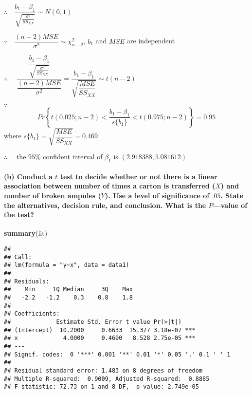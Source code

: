 \documentclass[]{article}
\newenvironment{Shaded}{\begin{snugshade}}{\end{snugshade}}
\newcommand{\KeywordTok}[1]{\textcolor[rgb]{0.13,0.29,0.53}{\textbf{#1}}}
\newcommand{\NormalTok}[1]{#1}
\let\oldparagraph\paragraph
\renewcommand{\paragraph}[1]{\oldparagraph{#1}\mbox{}}
\begin{document}
\(\therefore\quad \dfrac{b_1-\beta_1}{\sqrt{\frac{\sigma^2}{SS_{XX}}}}\sim N(0,1)\)

\(\because\quad\dfrac{(n-2)MSE}{\sigma^2}\sim \chi^2_{n-2}\), \(b_1\)
and \(MSE\) are independent

\(\therefore\quad\)
\(\dfrac{\ \dfrac{b_1-\beta_1}{\sqrt{\frac{\sigma^2}{SS_{XX}}}}\ }{\dfrac{(n-2)MSE}{\sigma^2}}=\dfrac{b_1-\beta_1}{\sqrt{\dfrac{MSE}{SS_{XX}}}}\sim t(n-2)\)

\(\because\quad\)
\[Pr\left\{t(0.025;n-2)<\dfrac{b_1-\beta_1}{s\{b_1\}}<t(0.975;n-2)\right\}=0.95\]
where \(s\{b_1\}=\sqrt{\dfrac{MSE}{SS_{XX}}}=0.469\)

\(\therefore\quad\) the \(95\%\) confident interval of \(\beta_1\) is
\((2.918388,5.081612)\)

\paragraph{\texorpdfstring{(b) Conduct a \(t\) test to decide whether or
not there is a linear association between number of times a carton is
transferred (\(X\)) and number of broken ampules (\(Y\)). Use a level of
significance of \(.05\). State the alternatives, decision rule, and
conclusion. What is the \(P\)---value of the
test?}{(b) Conduct a t test to decide whether or not there is a linear association between number of times a carton is transferred (X) and number of broken ampules (Y). Use a level of significance of .05. State the alternatives, decision rule, and conclusion. What is the P---value of the test?}}\label{b-conduct-a-t-test-to-decide-whether-or-not-there-is-a-linear-association-between-number-of-times-a-carton-is-transferred-x-and-number-of-broken-ampules-y.-use-a-level-of-significance-of-.05.-state-the-alternatives-decision-rule-and-conclusion.-what-is-the-pvalue-of-the-test}

\begin{Shaded}
\begin{Highlighting}[]
\KeywordTok{summary}\NormalTok{(fit)}
\end{Highlighting}
\end{Shaded}

\begin{verbatim}
## 
## Call:
## lm(formula = "y~x", data = data1)
## 
## Residuals:
##    Min     1Q Median     3Q    Max 
##   -2.2   -1.2    0.3    0.8    1.8 
## 
## Coefficients:
##             Estimate Std. Error t value Pr(>|t|)    
## (Intercept)  10.2000     0.6633  15.377 3.18e-07 ***
## x             4.0000     0.4690   8.528 2.75e-05 ***
## ---
## Signif. codes:  0 '***' 0.001 '**' 0.01 '*' 0.05 '.' 0.1 ' ' 1
## 
## Residual standard error: 1.483 on 8 degrees of freedom
## Multiple R-squared:  0.9009, Adjusted R-squared:  0.8885 
## F-statistic: 72.73 on 1 and 8 DF,  p-value: 2.749e-05
\end{verbatim}
\end{document}
